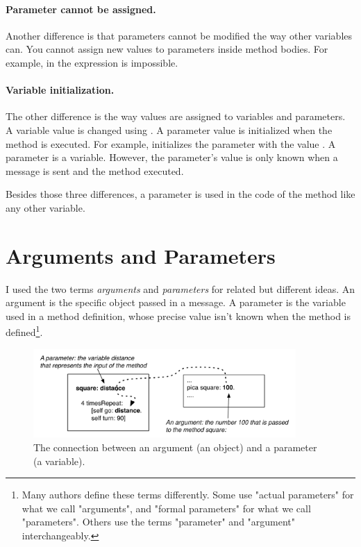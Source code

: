 \paragraph{Parameter cannot be assigned.} Another difference is that parameters cannot be modified the way other variables can. You cannot assign new values to parameters inside method bodies. For example, in 
 the expression  is impossible. 


\paragraph{Variable initialization.} The other difference is the way values are assigned to variables and parameters. A variable value is changed using \ct{:=}.  A parameter value is initialized when the method is executed. For example,  initializes the parameter  with the value . A parameter is a variable. However, the  parameter's value is only known when a message is sent and the method executed.

Besides those three differences, a parameter is used in the code of the method like any other variable.




\section{Arguments and Parameters} 
I used the two terms \emph{arguments} and \emph{parameters} for related but different ideas.  An argument is the specific object passed in a message. A parameter is the variable used in a method definition, whose precise value isn't known when the method is defined\footnote{Many authors define these terms differently. Some use "actual parameters" for what we call "arguments", and "formal parameters" for what we call "parameters". Others use the terms "parameter" and "argument" interchangeably.}. 

\begin{figure}[h]
\begin{center}
\includegraphics[width=10cm]{argparam2}
\caption{The connection between an argument (an object) and a parameter (a variable).\label{fig:argparam}}
\end{center}
\end{figure}

